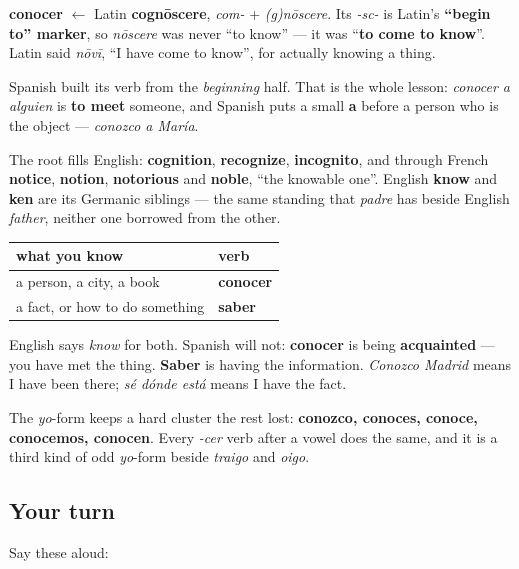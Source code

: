\begin{cousinweb}
\textbf{conocer} $\leftarrow$ Latin \textbf{cognōscere}, \emph{com-} + \emph{(g)nōscere}. Its \emph{-sc-} is Latin's \textbf{\textquotedblleft{}begin to\textquotedblright{} marker}, so \emph{nōscere} was never \textquotedblleft{}to know\textquotedblright{} — it was \textquotedblleft{}\textbf{to come to know}\textquotedblright{}. Latin said \emph{nōvī}, \textquotedblleft{}I have come to know\textquotedblright{}, for actually knowing a thing.

Spanish built its verb from the \emph{beginning} half. That is the whole lesson: \emph{conocer a alguien} is \textbf{to meet} someone, and Spanish puts a small \textbf{a} before a person who is the object — \emph{conozco a María}.

The root fills English: \textbf{cognition}, \textbf{recognize}, \textbf{incognito}, and through French \textbf{notice}, \textbf{notion}, \textbf{notorious} and \textbf{noble}, \textquotedblleft{}the knowable one\textquotedblright{}. English \textbf{know} and \textbf{ken} are its Germanic siblings — the same standing that \emph{padre} has beside English \emph{father}, neither one borrowed from the other.
\end{cousinweb}

\begin{grammarlens}[title={Grammar Lens: conocer and saber}]
\noindent
\begin{tabularx}{\linewidth}{@{}>{\raggedright\arraybackslash}X>{\raggedright\arraybackslash}X@{}}
\toprule
\textbf{what you know} & \textbf{verb} \\
\midrule
a person, a city, a book & \textbf{conocer} \\
a fact, or how to do something & \textbf{saber} \\
\bottomrule
\end{tabularx}

English says \emph{know} for both. Spanish will not: \textbf{conocer} is being \textbf{acquainted} — you have met the thing. \textbf{Saber} is having the information. \emph{Conozco Madrid} means I have been there; \emph{sé dónde está} means I have the fact.

The \emph{yo}-form keeps a hard cluster the rest lost: \textbf{conozco, conoces, conoce, conocemos, conocen}. Every \emph{-cer} verb after a vowel does the same, and it is a third kind of odd \emph{yo}-form beside \emph{traigo} and \emph{oigo}.
\end{grammarlens}

\subsection*{Your turn}
Say these aloud:


